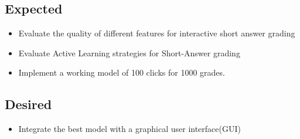 \documentclass[rnd]{mas_proposal}
\begin{document}
\subsection{Expected}
\begin{itemize}
    \item Evaluate the quality of different features for interactive short answer grading
    \item Evaluate Active Learning strategies for Short-Answer grading
    \item Implement a working model of 100 clicks for 1000 grades.
\end{itemize}

\subsection{Desired}
\begin{itemize}
    \item Integrate the best model with a graphical user interface(GUI)
\end{itemize}


\nocite{*}




 
\end{document}
